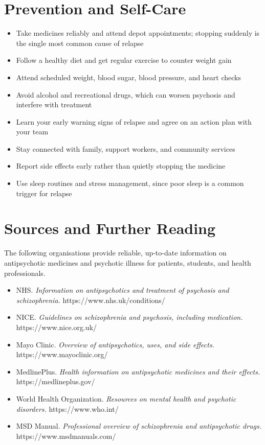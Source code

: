 \section*{Prevention and Self-Care}
\begin{itemize}
    \item Take medicines reliably and attend depot appointments; stopping suddenly is the single most common cause of relapse
    \item Follow a healthy diet and get regular exercise to counter weight gain
    \item Attend scheduled weight, blood sugar, blood pressure, and heart checks
    \item Avoid alcohol and recreational drugs, which can worsen psychosis and interfere with treatment
    \item Learn your early warning signs of relapse and agree on an action plan with your team
    \item Stay connected with family, support workers, and community services
    \item Report side effects early rather than quietly stopping the medicine
    \item Use sleep routines and stress management, since poor sleep is a common trigger for relapse
\end{itemize}

\section*{Sources and Further Reading}
The following organisations provide reliable, up-to-date information on antipsychotic medicines and psychotic illness for patients, students, and health professionals.

\begin{itemize}
    \item NHS. \textit{Information on antipsychotics and treatment of psychosis and schizophrenia.} https://www.nhs.uk/conditions/
    \item NICE. \textit{Guidelines on schizophrenia and psychosis, including medication.} https://www.nice.org.uk/
    \item Mayo Clinic. \textit{Overview of antipsychotics, uses, and side effects.} https://www.mayoclinic.org/
    \item MedlinePlus. \textit{Health information on antipsychotic medicines and their effects.} https://medlineplus.gov/
    \item World Health Organization. \textit{Resources on mental health and psychotic disorders.} https://www.who.int/
    \item MSD Manual. \textit{Professional overview of schizophrenia and antipsychotic drugs.} https://www.msdmanuals.com/
\end{itemize}
